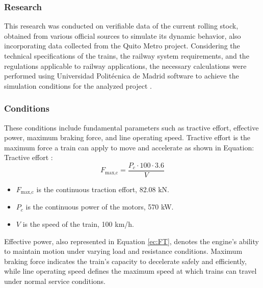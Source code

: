 \documentclass[conference]{IEEEtran}
\begin{document}
\subsubsection{Research}
This research was conducted on verifiable data of the current rolling stock, obtained from various official sources to simulate its dynamic behavior\cite{b11}, also incorporating data collected from the Quito Metro project. Considering the technical specifications of the trains, the railway system requirements\cite{b17}, and the regulations applicable to railway applications\cite{b16}, the necessary calculations were performed using Universidad Politécnica de Madrid software to achieve the simulation conditions for the analyzed project \cite{b4}.
\subsubsection{Conditions}
These conditions include fundamental parameters such as tractive effort, effective power, maximum braking force, and line operating speed. Tractive effort is the maximum force a train can apply to move and accelerate as shown in Equation:\\
Tractive effort \cite{b16}:
\begin{equation}
F_{\text{max,c}} = \frac{P_{c} \cdot 100 \cdot 3.6}{V}   
\label{ec:FT}
\end{equation}
\begin{itemize}
    \item $F_{\text{max,c}}$ is the continuous traction effort, 82.08 kN.
    \item $P_{c}$ is the continuous power of the motors, 570 kW. 
    \item $V$ is the speed of the train, 100 km/h.
\end{itemize}
Effective power, also represented in Equation \eqref{ec:FT}, denotes the engine's ability to maintain motion under varying load and resistance conditions. Maximum braking force indicates the train's capacity to decelerate safely and efficiently, while line operating speed defines the maximum speed at which trains can travel under normal service conditions.
\end{document}
